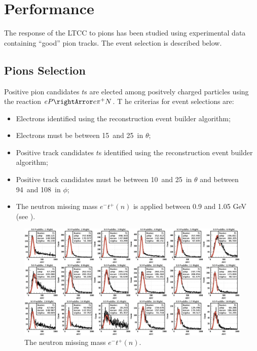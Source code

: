 \section{Performance}

The response of the LTCC to pions has been studied using experimental data containing ``good'' pion tracks.
The event selection is described below.

\subsection{Pions Selection}

Positive pion candidates $t$s are elected among positvely charged particles using the reaction $eP\rightArror e\pi^+N$. T
he criterias for event selections are:

\begin{itemize}
	\item Electrons identified using the reconstruction event builder algorithm;
    \item Electrons must be between 15\mdeg\ and 25\mdeg\ in $\theta$;
    \item Positive track candidates $t$s  identified using the reconstruction event builder algorithm;
    \item Positive track candidates must be between 10\mdeg\ and 25\mdeg\ in $\theta$ and between 94\mdeg\ and 108\mdeg\ in $\phi$;
	\item The neutron missing mass $e^-t^+(n)$ is applied between 0.9 and 1.05 GeV (see ).
\end{itemize}



\begin{figure}
	\centering
	\includegraphics[width=0.98\columnwidth,keepaspectratio]{img/neutronMM.png}
	\caption{The neutron missing mass $e^-t^+(n)$.  }
	\label{fig:neutronMM}
\end{figure}






